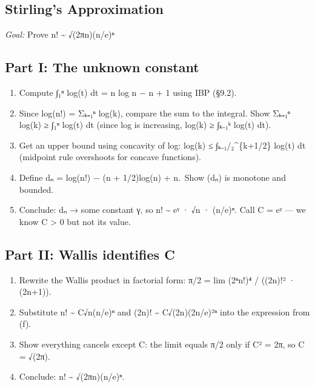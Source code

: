 \documentclass[
  10pt,
  letterpaper,
]{scrbook}
\begin{document}
\subsection{Stirling's Approximation}\label{stirlings-approximation}

\emph{Goal:} Prove n! \textasciitilde{} √(2πn)(n/e)ⁿ

\subsection{Part I: The unknown
constant}\label{part-i-the-unknown-constant}

\begin{enumerate}
\def\labelenumi{(\alph{enumi})}
\item
  Compute ∫₁ⁿ log(t) dt = n log n − n + 1 using IBP (§9.2).
\item
  Since log(n!) = Σₖ₌₁ⁿ log(k), compare the sum to the integral. Show
  Σₖ₌₁ⁿ log(k) ≥ ∫₁ⁿ log(t) dt (since log is increasing, log(k) ≥ ∫ₖ₋₁ᵏ
  log(t) dt).
\item
  Get an upper bound using concavity of log: log(k) ≤
  ∫ₖ₋₁/₂\^{}\{k+1/2\} log(t) dt (midpoint rule overshoots for concave
  functions).
\item
  Define dₙ = log(n!) − (n + 1/2)log(n) + n.~Show (dₙ) is monotone and
  bounded.
\item
  Conclude: dₙ → some constant γ, so n! \textasciitilde{} eᵞ · √n ·
  (n/e)ⁿ. Call C = eᵞ --- we know C \textgreater{} 0 but not its value.
\end{enumerate}

\subsection{Part II: Wallis identifies
C}\label{part-ii-wallis-identifies-c}

\begin{enumerate}
\def\labelenumi{(\alph{enumi})}
\setcounter{enumi}{5}
\item
  Rewrite the Wallis product in factorial form: π/2 = lim (2ⁿn!)⁴ /
  ((2n)!² · (2n+1)).
\item
  Substitute n! \textasciitilde{} C√n(n/e)ⁿ and (2n)! \textasciitilde{}
  C√(2n)(2n/e)²ⁿ into the expression from (f).
\item
  Show everything cancels except C: the limit equals π/2 only if C² =
  2π, so C = √(2π).
\item
  Conclude: n! \textasciitilde{} √(2πn)(n/e)ⁿ.
\end{enumerate}
\end{document}
